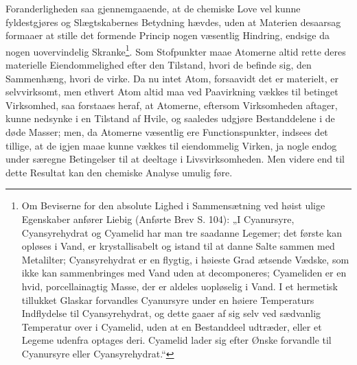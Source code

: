 \documentclass[12pt,a4paper]{book}
\begin{document}
Foranderligheden saa gjennemgaaende, at de chemiske Love vel kunne
fyldestgjøres og Slægtskabernes Betydning hævdes, uden at Materien
desaarsag formaaer at stille det formende Princip nogen væsentlig
Hindring, endsige da nogen uovervindelig
Skranke\footnote{Om Beviserne for den absolute Lighed i
Sammensætning ved høist ulige Egenskaber anfører Liebig (Anførte
Brev S. 104): „I Cyanursyre, Cyansyrehydrat og Cyamelid har man tre
saadanne Legemer; det første kan opløses i Vand, er krystallisabelt
og istand til at danne Salte sammen med Metalilter; Cyansyrehydrat
er en flygtig, i høieste Grad ætsende Vædske, som ikke kan
sammenbringes med Vand uden at decomponeres; Cyameliden er en hvid,
porcellainagtig Masse, der er aldeles uopløselig i Vand. I et
hermetisk tillukket Glaskar forvandles Cyanursyre under en høiere
Temperaturs Indflydelse til Cyansyrehydrat, og dette gaaer af sig
selv ved sædvanlig Temperatur over i Cyamelid, uden at en
Bestanddeel udtræder, eller et Legeme udenfra optages deri.
Cyamelid lader sig efter Ønske forvandle til Cyanursyre eller
Cyansyrehydrat.“
}. Som Stofpunkter maae Atomerne
altid rette deres materielle Eiendommelighed efter den Tilstand,
hvori de befinde sig, den Sammenhæng, hvori de virke. Da nu intet
Atom, forsaavidt det er materielt, er selvvirksomt, men ethvert Atom
altid maa ved Paavirkning vækkes til betinget Virksomhed, saa
forstaaes heraf, at Atomerne, eftersom Virksomheden aftager, kunne
nedsynke i en Tilstand af Hvile, og saaledes udgjøre Bestanddelene i
de døde Masser; men, da Atomerne væsentlig ere Functionspunkter,
indsees det tillige, at de igjen maae kunne vækkes til
eiendommelig Virken, ja nogle endog under særegne Betingelser til
at deeltage i Livsvirksomheden. Men videre end til dette Resultat
kan den chemiske Analyse umulig føre.
\end{document}
